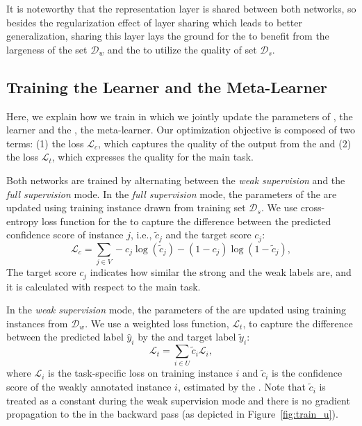 It is noteworthy that the representation layer is shared between both networks, so besides the regularization effect of layer sharing which leads to better generalization, sharing this layer lays the ground for the \cnet to benefit from the largeness of the set $\mathcal{D}_w$ and the \tnet to utilize the quality of set $\mathcal{D}_s$. 

\subsection{Training the Learner and the Meta-Learner}
\label{sec:modeltraining}
Here, we explain how we train \cws in which we jointly update the parameters of \tnet, the learner and the \cnet, the meta-learner. 
Our optimization objective is composed of two terms: (1) the \cnet loss $\mathcal{L}_c$, which captures the quality of the output from the \cnet and (2) the \tnet loss $\mathcal{L}_t$, which expresses the quality for the main task. 

Both networks are trained by alternating between the \emph{weak supervision} and the \emph{full supervision} mode.
%
In the \emph{full supervision} mode, the parameters of the \cnet are updated using training instance drawn from training set $\mathcal{D}_s$. We use cross-entropy loss function for the \cnet to capture the difference between the predicted confidence score of instance $j$, i.e., $\tilde{c}_j$ and the target score $c_j$:
\begin{equation}
\mathcal{L}_c = \sum_{j\in V} -  c_j \log(\tilde{c}_j) - (1-c_j) \log(1-\tilde{c}_j),
\end{equation}
The target score $c_j$ indicates how similar the strong and the weak labels are, and it is calculated with respect to the main task. 

In the \emph{weak supervision} mode, the parameters of the \tnet are updated using training instances from $\mathcal{D}_w$. We use a weighted loss function, $\mathcal{L}_t$, to capture the difference between the predicted label $\hat{y}_i$ by the \tnet and target label $\tilde{y}_i$:
\begin{equation}
\mathcal{L}_t = \sum_{i\in U} \tilde{c}_i \mathcal{L}_i,
\end{equation}
where $\mathcal{L}_i$ is the task-specific loss on training instance $i$ and $\tilde{c}_i$ is the confidence score of the weakly annotated instance $i$, estimated by the \cnet.
Note that $\tilde{c}_i$ is treated as a constant during the weak supervision mode and there is no gradient propagation to the \cnet in the backward pass (as depicted in Figure~\ref{fig:train_u}). 


